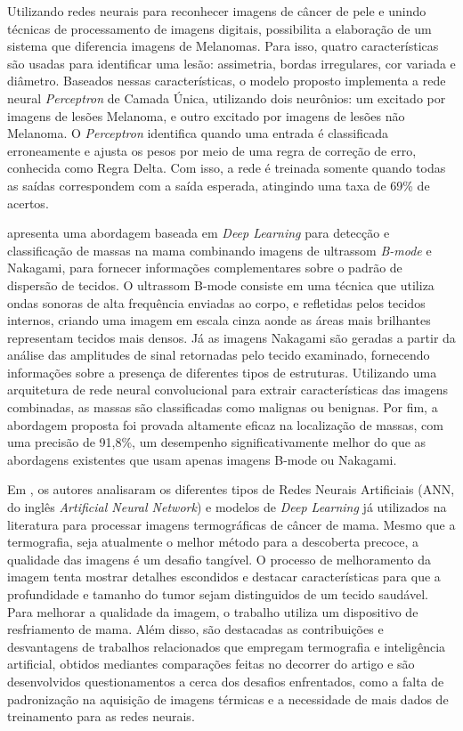 Utilizando redes neurais para reconhecer imagens de câncer de pele e unindo técnicas de processamento de imagens digitais,  possibilita a elaboração de um sistema que diferencia imagens de Melanomas. Para isso, quatro características são usadas para identificar uma lesão: assimetria, bordas irregulares, cor variada e diâmetro. Baseados nessas características, o modelo proposto implementa a rede neural \textit{Perceptron} de Camada Única, utilizando dois neurônios: um excitado por imagens de lesões Melanoma, e outro excitado por imagens de lesões não Melanoma. O \textit{Perceptron} identifica quando uma entrada é classificada erroneamente e ajusta os pesos por meio de uma regra de correção de erro, conhecida como Regra Delta. Com isso, a rede é treinada somente quando todas as saídas correspondem com a saída esperada, atingindo uma taxa de 69\% de acertos.

 apresenta uma abordagem baseada em \textit{Deep Learning} para detecção e classificação de massas na mama combinando imagens de ultrassom \textit{B-mode} e Nakagami, para fornecer informações complementares sobre o padrão de dispersão de tecidos. O ultrassom B-mode consiste em uma técnica que utiliza ondas sonoras de alta frequência enviadas ao corpo, e refletidas pelos tecidos internos, criando uma imagem em escala cinza aonde as áreas mais brilhantes representam tecidos mais densos. Já as imagens Nakagami são geradas a partir da análise das amplitudes de sinal retornadas pelo tecido examinado, fornecendo informações sobre a presença de diferentes tipos de estruturas. Utilizando uma arquitetura de rede neural convolucional para extrair características das imagens combinadas, as massas são classificadas como malignas ou benignas. Por fim, a abordagem proposta foi provada altamente eficaz na localização de massas, com uma precisão de 91,8\%, um desempenho significativamente melhor do que as abordagens existentes que usam apenas imagens B-mode ou Nakagami.

Em , os autores analisaram os diferentes tipos de Redes Neurais Artificiais (ANN, do inglês \textit{Artificial Neural Network}) e modelos de \textit{Deep Learning} já utilizados na literatura para processar imagens termográficas de câncer de mama. Mesmo que a termografia, seja atualmente o melhor método para a descoberta precoce, a qualidade das imagens é um desafio tangível. O processo de melhoramento da imagem tenta mostrar detalhes escondidos e destacar características para que a profundidade e tamanho do tumor sejam distinguidos de um tecido saudável. Para melhorar a qualidade da imagem, o trabalho utiliza um dispositivo de resfriamento de mama. Além disso, são destacadas as contribuições e desvantagens de trabalhos relacionados que empregam termografia e inteligência artificial, obtidos mediantes comparações feitas no decorrer do artigo e são desenvolvidos questionamentos a cerca dos desafios enfrentados, como a falta de padronização na aquisição de imagens térmicas e a necessidade de mais dados de treinamento para as redes neurais. 

